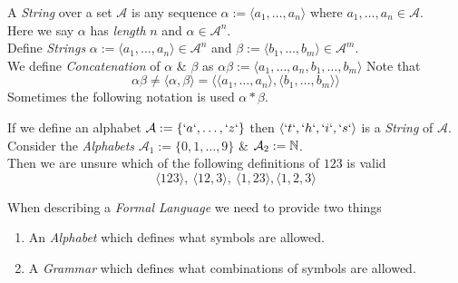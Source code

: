 \documentclass[11pt,a4paper]{article}
\begin{document}
A \textit{String} over a set $\mathcal{A}$ is any sequence $\alpha:=\langle a_1,\dots,a_n\rangle$ where $a_1,\dots,a_n\in\mathcal{A}$.\\
\nb Here we say $\alpha$ has \textit{length} $n$ and $\alpha\in\mathcal{A}^n$.\\

Define \textit{Strings} $\alpha:=\langle a_1,\dots,a_n\rangle\in\mathcal{A}^n$ and $\beta:=\langle b_1,\dots,b_m\rangle\in\mathcal{A}^m$.\\
We define \textit{Concatenation} of $\alpha$ \& $\beta$ as
$\alpha\beta:=\langle a_1,\dots,a_n,b_1,\dots,b_m\rangle$
Note that
$$\alpha\beta\neq\langle\alpha,\beta\rangle=\langle\langle a_1,\dots,a_n\rangle,\langle b_1,\dots,b_m\rangle\rangle$$
\nb Sometimes the following notation is used $\alpha*\beta$.

If we define an alphabet $\mathcal{A}:=\{`a`,\dots,`z`\}$ then $\langle`t`,`h`,`i`,`s`\rangle$ is a \textit{String} of $\mathcal{A}$.\\

Consider the \textit{Alphabets} $\mathcal{A}_1:=\{0,1,\dots,9\}$ \& $\mathcal{A}_2:=\mathbb{N}$.\\
Then we are unsure which of the following definitions of $123$ is valid
$$\langle123\rangle,\ \langle12,3\rangle,\ \langle1,23\rangle, \langle1,2,3\rangle$$


When describing a \textit{Formal Language} we need to provide two things
\begin{enumerate}
	\item An \textit{Alphabet} which defines what symbols are allowed.
	\item A \textit{Grammar} which defines what combinations of symbols are allowed.
\end{enumerate}
\end{document}
